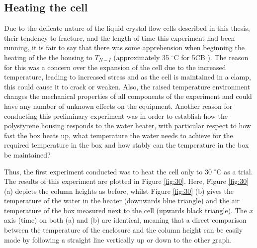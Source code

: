 \subsection{Heating the cell}
Due to the delicate nature of the liquid crystal flow cells described in this thesis, their tendency to fracture, and the length of time this experiment had been running, it is fair to say that there was some apprehension when beginning the heating of the the housing to $T_{N-I}$ (approximately 35 $^{\circ}\text{C}$ for 5CB \cite{Skarp1979}). The reason for this was a concern over the expansion of the cell due to the increased temperature, leading to increased stress and as the cell is maintained in a clamp, this could cause it to crack or weaken. Also, the raised temperature environment changes the mechanical properties of all components of the experiment and could have any number of unknown effects on the equipment. Another reason for conducting this preliminary experiment was in order to establish how the polystyrene housing responds to the water heater, with particular respect to how fast the box heats up, what temperature the water needs to achieve for the required temperature in the box and how stably can the temperature in the box be maintained?

Thus, the first experiment conducted was to heat the cell only to 30 $^{\circ}\text{C}$ as a trial. The results of this experiment are plotted in Figure \ref{fig:30}. Here, Figure \ref{fig:30} (a) depicts the column heights as before, whilst Figure \ref{fig:30} (b) gives the temperature of the water in the heater (downwards blue triangle) and the air temperature of the box measured next to the cell (upwards black triangle). The $x$ axis (time) on both (a) and (b) are identical, meaning that a direct comparison between the temperature of the enclosure and the column height can be easily made by following a straight line vertically up or down to the other graph.

